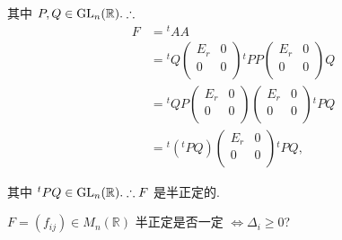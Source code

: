 \documentclass{ctexart}
\begin{document}
\begin{solution}
    其中 $P,Q\in\operatorname{GL} _n(\mathbb{R}).\therefore$
    \begin{align*}
        F & ={}^tAA \\
        & ={}^tQ\begin{pmatrix}
            E_r & 0 \\
            0 & 0 \\
        \end{pmatrix}{}^tPP\begin{pmatrix}
            E_r & 0 \\
            0 & 0 \\
        \end{pmatrix}Q \\
        & ={}^tQP\begin{pmatrix}
            E_r & 0 \\
            0 & 0 \\
        \end{pmatrix}\begin{pmatrix}
            E_r & 0 \\
            0 & 0 \\
        \end{pmatrix}{}^tPQ \\
        & ={}^t({}^tPQ)\begin{pmatrix}
            E_r & 0 \\
            0 & 0 \\
        \end{pmatrix}{}^tPQ,
    \end{align*}

    其中 ${}^tPQ\in\operatorname{GL} _n(\mathbb{R}).\therefore F$ 是半正定的.
\end{solution}
\begin{exercisec}%
    $F=(f_{ij})\in M_n(\mathbb{R})$ 半正定是否一定 $\Leftrightarrow\Delta_i\geq0$?
\end{exercisec}
\end{document}
